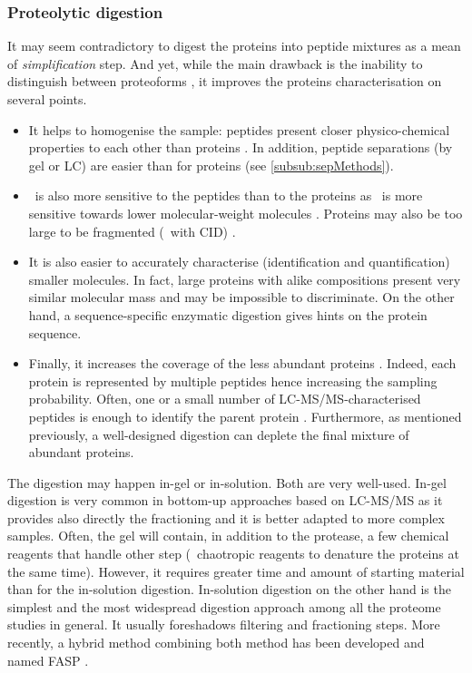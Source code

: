 \subsubsection{Proteolytic digestion}
It may seem contradictory to digest the proteins into peptide mixtures as a mean
of \emph{simplification} step. And yet, while the main drawback is the inability
to distinguish between proteoforms , it improves the proteins
characterisation on several points.
\begin{itemize}
    \item It helps to homogenise the sample: peptides present closer
        physico-chemical properties to each other than proteins .
        In addition, peptide separations (by gel or \gls{LC}) are easier than
        for proteins (see \cref{subsub:sepMethods}).
    \item \ms\ is also more sensitive to the peptides than to the proteins as
        \ms\ is more sensitive towards lower molecular-weight molecules
        . Proteins may also be too large to be
        fragmented (\eg\ with \gls{CID}) .
    \item It is also easier to accurately characterise (identification and
        quantification) smaller molecules. In fact, large proteins with alike
        compositions present very similar molecular mass and may be impossible
        to discriminate. On the other hand, a sequence-specific enzymatic
        digestion gives hints on the protein sequence.
    \item Finally, it increases the coverage of the less abundant proteins
        . Indeed, each protein is represented by multiple
        peptides hence increasing the sampling probability. Often, one or a small
        number of \gls{LC-MS/MS}-characterised peptides is enough to identify the
        parent protein .
        Furthermore, as mentioned previously, a well-designed digestion can deplete
        the final mixture of abundant proteins.
\end{itemize}

The digestion may happen in-gel or in-solution. Both are very well-used.
In-gel digestion is very common in bottom-up approaches based on \gls{LC-MS/MS}
as it provides also directly the fractioning and it is better adapted to more
complex samples. Often, the gel will contain, in addition to the protease, a few
chemical reagents that handle other step (\eg\ chaotropic reagents to denature
the proteins at the same time). However, it requires greater time and amount of
starting material than for the in-solution digestion. In-solution digestion
on the other hand is the simplest and the most widespread
digestion approach among all the proteome studies in general. It usually
foreshadows filtering and fractioning steps. More recently, a hybrid method
combining both method has been developed and named \acrfull{FASP}
.

